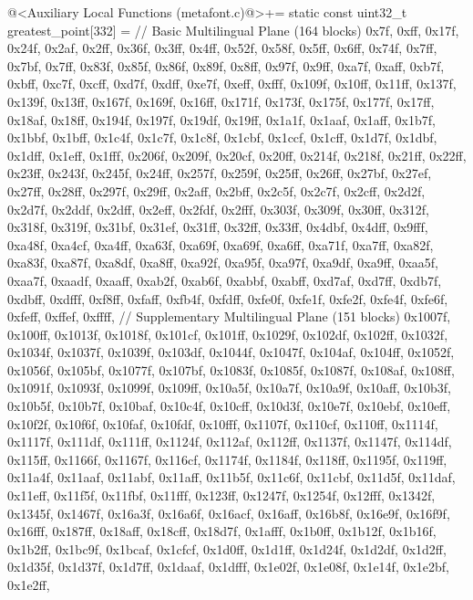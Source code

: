{{{{{\iniciocodigo
@<Auxiliary Local Functions (metafont.c)@>+=
static const uint32_t greatest_point[332] = {
  // Basic Multilingual Plane  (164 blocks)
0x7f, 0xff, 0x17f, 0x24f, 0x2af, 0x2ff, 0x36f, 0x3ff, 0x4ff, 0x52f,
0x58f, 0x5ff, 0x6ff, 0x74f, 0x7ff, 0x7bf, 0x7ff, 0x83f, 0x85f, 0x86f,
0x89f, 0x8ff, 0x97f, 0x9ff, 0xa7f, 0xaff, 0xb7f, 0xbff, 0xc7f, 0xcff,
0xd7f, 0xdff, 0xe7f, 0xeff, 0xfff, 0x109f, 0x10ff, 0x11ff, 0x137f, 0x139f,
0x13ff, 0x167f, 0x169f, 0x16ff, 0x171f, 0x173f, 0x175f, 0x177f, 0x17ff, 0x18af,
0x18ff, 0x194f, 0x197f, 0x19df, 0x19ff, 0x1a1f, 0x1aaf, 0x1aff, 0x1b7f, 0x1bbf,
0x1bff, 0x1c4f, 0x1c7f, 0x1c8f, 0x1cbf, 0x1ccf, 0x1cff, 0x1d7f, 0x1dbf, 0x1dff,
0x1eff, 0x1fff, 0x206f, 0x209f, 0x20cf, 0x20ff, 0x214f, 0x218f, 0x21ff, 0x22ff,
0x23ff, 0x243f, 0x245f, 0x24ff, 0x257f, 0x259f, 0x25ff, 0x26ff, 0x27bf, 0x27ef,
0x27ff, 0x28ff, 0x297f, 0x29ff, 0x2aff, 0x2bff, 0x2c5f, 0x2c7f, 0x2cff, 0x2d2f,
0x2d7f, 0x2ddf, 0x2dff, 0x2eff, 0x2fdf, 0x2fff, 0x303f, 0x309f, 0x30ff, 0x312f,
0x318f, 0x319f, 0x31bf, 0x31ef, 0x31ff, 0x32ff, 0x33ff, 0x4dbf, 0x4dff, 0x9fff,
0xa48f, 0xa4cf, 0xa4ff, 0xa63f, 0xa69f, 0xa69f, 0xa6ff, 0xa71f, 0xa7ff, 0xa82f,
0xa83f, 0xa87f, 0xa8df, 0xa8ff, 0xa92f, 0xa95f, 0xa97f, 0xa9df, 0xa9ff, 0xaa5f,
0xaa7f, 0xaadf, 0xaaff, 0xab2f, 0xab6f, 0xabbf, 0xabff, 0xd7af, 0xd7ff, 0xdb7f,
0xdbff, 0xdfff, 0xf8ff, 0xfaff, 0xfb4f, 0xfdff, 0xfe0f, 0xfe1f, 0xfe2f, 0xfe4f,
0xfe6f, 0xfeff, 0xffef, 0xffff,
  // Supplementary Multilingual Plane (151 blocks)
0x1007f, 0x100ff, 0x1013f, 0x1018f, 0x101cf, 0x101ff, 0x1029f, 0x102df,
0x102ff, 0x1032f, 0x1034f, 0x1037f, 0x1039f, 0x103df, 0x1044f, 0x1047f,
0x104af, 0x104ff, 0x1052f, 0x1056f, 0x105bf, 0x1077f, 0x107bf, 0x1083f,
0x1085f, 0x1087f, 0x108af, 0x108ff, 0x1091f, 0x1093f, 0x1099f, 0x109ff,
0x10a5f, 0x10a7f, 0x10a9f, 0x10aff, 0x10b3f, 0x10b5f, 0x10b7f, 0x10baf,
0x10c4f, 0x10cff, 0x10d3f, 0x10e7f, 0x10ebf, 0x10eff, 0x10f2f, 0x10f6f,
0x10faf, 0x10fdf, 0x10fff, 0x1107f, 0x110cf, 0x110ff, 0x1114f, 0x1117f,
0x111df, 0x111ff, 0x1124f, 0x112af, 0x112ff, 0x1137f, 0x1147f, 0x114df,
0x115ff, 0x1166f, 0x1167f, 0x116cf, 0x1174f, 0x1184f, 0x118ff, 0x1195f,
0x119ff, 0x11a4f, 0x11aaf, 0x11abf, 0x11aff, 0x11b5f, 0x11c6f, 0x11cbf,
0x11d5f, 0x11daf, 0x11eff, 0x11f5f, 0x11fbf, 0x11fff, 0x123ff, 0x1247f,
0x1254f, 0x12fff, 0x1342f, 0x1345f, 0x1467f, 0x16a3f, 0x16a6f, 0x16acf,
0x16aff, 0x16b8f, 0x16e9f, 0x16f9f, 0x16fff, 0x187ff, 0x18aff, 0x18cff,
0x18d7f, 0x1afff, 0x1b0ff, 0x1b12f, 0x1b16f, 0x1b2ff, 0x1bc9f, 0x1bcaf,
0x1cfcf, 0x1d0ff, 0x1d1ff, 0x1d24f, 0x1d2df, 0x1d2ff, 0x1d35f, 0x1d37f,
0x1d7ff, 0x1daaf, 0x1dfff, 0x1e02f, 0x1e08f, 0x1e14f, 0x1e2bf, 0x1e2ff,
}}}}}}
